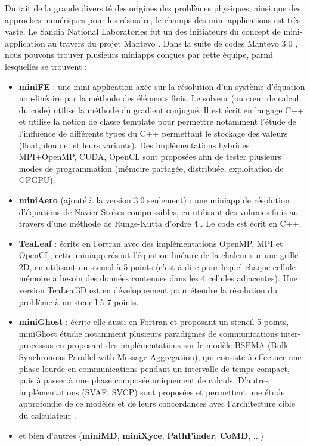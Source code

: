 \documentclass[11pt,a4paper,oneside]{memoir}
\theoremstyle{definition}
\theoremstyle{remark}
\theoremstyle{plain}
\begin{document}
Du fait de la grande diversité des origines des problèmes physiques, ainsi que des approches numériques pour les résoudre, le champs des mini-applications est très vaste. Le Sandia National Laboratories fut un des initiateurs du concept de mini-application au travers du projet Mantevo \cite{mantevo-project}. Dans la suite de codes Mantevo 3.0 \cite{heroux2015}, nous pouvons trouver plusieurs miniapps conçues par cette équipe, parmi lesquelles se trouvent :
\begin{itemize}
\item \textbf{miniFE} : une mini-application axée sur la résolution d'un système d'équation non-linéaire par la méthode des éléments finis. Le solveur (ou cœur de calcul du code) utilise la méthode du gradient conjugué. Il est écrit en langage C++ et utilise la notion de classe template pour permettre notamment l'étude de l'influence de différents types du C++ permettant le stockage des valeurs (float, double, et leurs variants). Des implémentations hybrides MPI+OpenMP, CUDA, OpenCL sont proposées afin de tester plusieurs modes de programmation (mémoire partagée, distribuée, exploitation de GPGPU).
\item \textbf{miniAero} (ajouté à la version 3.0 seulement) : une miniapp de résolution d'équations de Navier-Stokes compressibles, en utilisant des volumes finis au travers d'une méthode de Runge-Kutta d'ordre 4 \cite{miniaero-code}. Le code est écrit en C++.
\item \textbf{TeaLeaf} : écrite en Fortran avec des implémentations OpenMP, MPI et OpenCL, cette miniapp résout l'équation linéaire de la chaleur sur une grille 2D, en utilisant un stencil à 5 points (c'est-à-dire pour lequel chaque cellule mémoire a besoin des données contenues dans les 4 cellules adjacentes). Une version TeaLeaf3D est en développement pour étendre la résolution du problème à un stencil à 7 points. \cite{tealeaf}
\item \textbf{miniGhost} : écrite elle aussi en Fortran et proposant un stencil 5 points, miniGhost étudie notamment plusieurs paradigmes de communications inter-processus en proposant des implémentations sur le modèle BSPMA (Bulk Synchronous Parallel with Message Aggregation), qui consiste à effectuer une phase lourde en communications pendant un intervalle de temps compact, puis à passer à une phase composée uniquement de calculs. D'autres implémentations (SVAF, SVCP) sont proposées et permettent une étude approfondie de ce modèles et de leurs concordances avec l'architecture cible du calculateur \cite{barrett2012}.
\item et bien d'autres (\textbf{miniMD}, \textbf{miniXyce}, \textbf{PathFinder}, \textbf{CoMD}, ...) \cite{heroux2015}
\end{itemize}\bigskip
\end{document}

